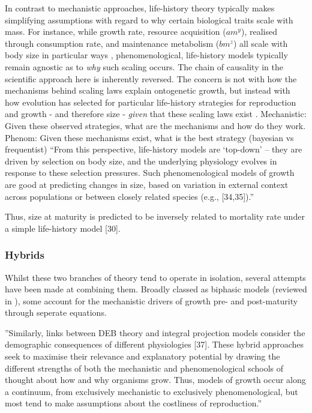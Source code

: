 \documentclass[a4paper]{article} %
\begin{document}
        In contrast to mechanistic approaches, life-history theory typically makes simplifying assumptions with regard to why certain biological traits scale with mass. \autocite{Day1997, Kozowski1987-indeterminate} For instance, while growth rate, resource acquisition ($am^y$), realised through consumption rate, and maintenance metabolism ($bm^z$) all scale with body size in particular ways \autocite{peters1983,Werner1988,brown2000-scaling-book}, phenomenological, life-history models typically remain agnostic as to \textit{why} such scaling occurs. The chain of causality in the scientific approach here is inherently reversed. The concern is not with how the mechanisms behind scaling laws explain ontogenetic growth, but instead with how evolution has selected for particular life-history strategies for reproduction and growth - and therefore size - \textit{given} that these scaling laws exist \autocite{Danko2017}. Mechanistic: Given these observed strategies, what are the mechanisms and how do they work. Phenom: Given these mechanisms exist, what is the best strategy (bayesian vs frequentist) ``From this perspective, life-history models are ‘top-down’ – they are driven by selection on body size, and the underlying physiology evolves in response to these selection pressures. Such phenomenological models of growth are good at predicting changes in size, based on variation in external context across populations or between closely related species (e.g., [34,35]).''
        
        Thus, size at maturity is predicted to be inversely related to mortality rate under a simple life-history model [30].

        \subsubsection{Hybrids}
        Whilst these two branches of theory tend to operate in isolation, several attempts have been made at combining them. Broadly classed as biphasic models (reviewed in \autocite{Wilson2018}), some account for the mechanistic drivers of growth pre- and post-maturity through seperate equations. 
        
        ''Similarly, links between DEB theory and integral projection models consider the demographic consequences of different physiologies [37]. These hybrid approaches seek to maximise their relevance and explanatory potential by drawing the different strengths of both the mechanistic and phenomenological schools of thought about how and why organisms grow. Thus, models of growth occur along a continuum, from exclusively mechanistic to exclusively phenomenological, but most tend to make assumptions about the costliness of reproduction.''
        
\end{document}
